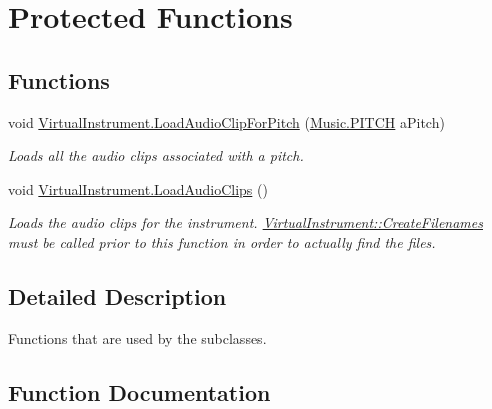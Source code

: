 \hypertarget{group___v_i_base_pro_func}{}\section{Protected Functions}
\label{group___v_i_base_pro_func}
\subsection*{Functions}
\begin{DoxyCompactItemize}
\item 
void \hyperlink{group___v_i_base_pro_func_gadbd95083895b09465fbc5b18115a1dbc}{Virtual\+Instrument.\+Load\+Audio\+Clip\+For\+Pitch} (\hyperlink{group___music_enums_ga508f69b199ea518f935486c990edac1d}{Music.\+P\+I\+T\+CH} a\+Pitch)
\begin{DoxyCompactList}\small\item\em Loads all the audio clips associated with a pitch. \end{DoxyCompactList}\item 
void \hyperlink{group___v_i_base_pro_func_ga873242f52d077ca4305b0b69a0100b55}{Virtual\+Instrument.\+Load\+Audio\+Clips} ()
\begin{DoxyCompactList}\small\item\em Loads the audio clips for the instrument. \hyperlink{group___v_i_base_virt_func_gaacfc9521214176292bfb9665556fb991}{Virtual\+Instrument\+::\+Create\+Filenames} must be called prior to this function in order to actually find the files. \end{DoxyCompactList}\end{DoxyCompactItemize}


\subsection{Detailed Description}
Functions that are used by the subclasses. 

\subsection{Function Documentation}
\mbox{\label{group___v_i_base_pro_func_gadbd95083895b09465fbc5b18115a1dbc}} 
